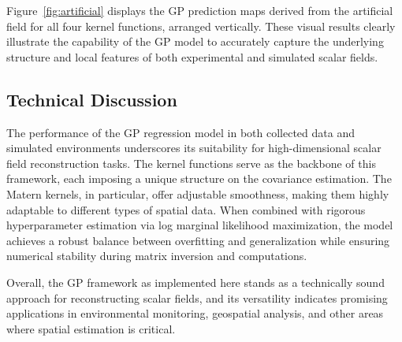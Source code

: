 \documentclass[conference]{IEEEtran}
\begin{document}
    Figure~\ref{fig:artificial} displays the GP prediction maps derived from the artificial field for all four kernel functions, arranged vertically. 
    These visual results clearly illustrate the capability of the GP model to accurately capture the underlying structure and local features of both experimental and simulated scalar fields.

\begin{figure*}[!t]
    \centering
    \par\bigskip
    \par\bigskip
    \par\bigskip
    \caption{Artificial field validation: GP prediction maps for the four kernel functions.}
    \label{fig:artificial}
\end{figure*}

\subsection{Technical Discussion}

    The performance of the GP regression model in both collected data and simulated environments underscores its suitability for high-dimensional scalar field reconstruction tasks. 
    The kernel functions serve as the backbone of this framework, each imposing a unique structure on the covariance estimation. 
    The Matern kernels, in particular, offer adjustable smoothness, making them highly adaptable to different types of spatial data. 
    When combined with rigorous hyperparameter estimation via log marginal likelihood maximization, 
    the model achieves a robust balance between overfitting and generalization while ensuring numerical stability during matrix inversion and computations.

    Overall, the GP framework as implemented here stands as a technically sound approach for reconstructing scalar fields, 
    and its versatility indicates promising applications in environmental monitoring, geospatial analysis, and other areas where spatial estimation is critical.
\end{document}
